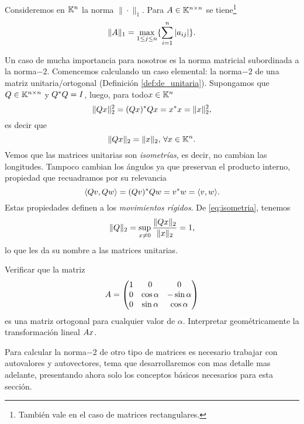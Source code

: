 \begin{ejemplo}
Consideremos en $\mathbb K^n$ la norma $\|\cdot\|_1$. Para $\Ab\in \Knn$ se tiene\footnote{También vale  en el caso de matrices rectangulares.}
\tcc
$$
 \|\Ab\|_1=\max_{1\le j\le n}\{\sum_{i=1}^{n} |a_{ij}|\}.
$$
\etcc
\end{ejemplo}
Un caso de mucha importancia para nosotros es la norma matricial subordinada a la norma$-2$.
Comencemos calculando un caso elemental: la norma$-2$ de una matriz unitaria/ortogonal (Definición \ref{def:de_unitaria}).
Supongamos que $\Qb\in \Knn$ y $\Qb^*\Qb=\Ib$, luego, para todo$\xb\in\Kn$
$$
\|\Qb\xb\|_2^2=(\Qb\xb)^*\Qb\xb=\xb^*\xb=\|\xb\|^2_2,
$$
es decir que
\begin{equation}
\label{eq:isometria}
\|\Qb\xb\|_2=\|\xb\|_2, \, \forall \xb\in \K^n.
\end{equation}
 Vemos que las matrices unitarias son \emph{isometrías}, es decir, no cambian las longitudes. Tampoco cambian los ángulos ya que preservan el producto interno, propiedad que recuadramos por su relevancia
 \tcc
 \begin{equation}
 \label{eq:preservaPI}
\langle \Qb\vb,\Qb\wb \rangle=(\Qb\vb)^*\Qb\wb=\vb^*\wb=\langle \vb,\wb \rangle.
 \end{equation}
\etcc
Estas propiedades definen a los \emph{movimientos rígidos}. De \eqref{eq:isometria}, tenemos
$$
\|\Qb\|_2=\sup_{\xb\neq\cero}\frac{\|\Qb\xb\|_2}{\|\xb\|_2}=1,
$$
lo que les da su nombre a las matrices unitarias.
\begin{ej}Verificar que la matriz
$$
\Ab = \begin{pmatrix}
1 & 0 & 0 \\ 0 & \cos \alpha & -\sin \alpha \\ 0 & \sin \alpha & \cos \alpha
\end{pmatrix}
$$
es una matriz ortogonal para cualquier valor de $\alpha$. Interpretar geométricamente la transformación lineal $\Ab\xb$.
\end{ej}

Para calcular la norma$-2$ de otro tipo de matrices  es necesario trabajar con autovalores y autovectores, tema que desarrollaremos con mas detalle mas adelante, presentando ahora solo los conceptos básicos necesarios para esta sección.

